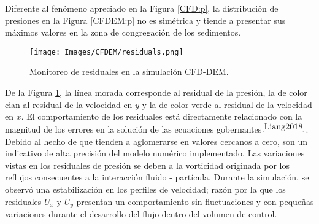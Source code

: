 \noindent
\justify

Diferente al fen\'omeno apreciado en la Figura \ref{CFD:p}, la distribuci\'on de presiones en la Figura \ref{CFDEM:p} no es sim\'etrica y tiende a presentar sus m\'aximos valores en la zona de congregaci\'on de los sedimentos.

\begin{figure}[h!]
	\centering
	\texttt{[image: Images/CFDEM/residuals.png]}
	\caption{Monitoreo de residuales en la simulaci\'on CFD-DEM.}
	\label{CFDEM:residuals}
\end{figure}

\noindent
\justify

De la Figura \ref{CFDEM:residuals}, la l\'inea morada corresponde al residual de la presi\'on, la de color cian al residual de la velocidad en $y$ y la de color verde al residual de la velocidad en $x$. El comportamiento de los residuales est\'a directamente relacionado con la magnitud de los errores en la soluci\'on de las ecuaciones gobernantes$^{\cite{Liang2018}}$. Debido al hecho de que tienden a aglomerarse en valores cercanos a cero, son un indicativo de alta precisi\'on del modelo num\'erico implementado. Las variaciones vistas en los residuales de presi\'on se deben a la vorticidad originada por los reflujos consecuentes a la interacci\'on fluido - part\'icula. Durante la simulaci\'on, se observ\'o una estabilizaci\'on en los perfiles de velocidad; raz\'on por la que los residuales $U_x$ y $U_y$ presentan un comportamiento sin fluctuaciones y con peque\~nas variaciones durante el desarrollo del flujo dentro del volumen de control.